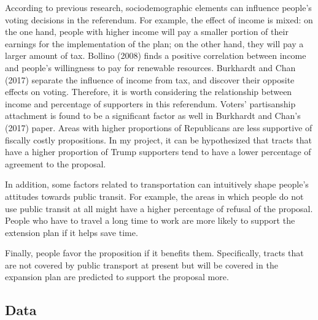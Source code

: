 \documentclass[
]{article}
\begin{document}
According to previous research, sociodemographic elements can influence
people's voting decisions in the referendum. For example, the effect of
income is mixed: on the one hand, people with higher income will pay a
smaller portion of their earnings for the implementation of the plan; on
the other hand, they will pay a larger amount of tax. Bollino (2008)
finds a positive correlation between income and people's willingness to
pay for renewable resources. Burkhardt and Chan (2017) separate the
influence of income from tax, and discover their opposite effects on
voting. Therefore, it is worth considering the relationship between
income and percentage of supporters in this referendum. Voters'
partisanship attachment is found to be a significant factor as well in
Burkhardt and Chan's (2017) paper. Areas with higher proportions of
Republicans are less supportive of fiscally costly propositions. In my
project, it can be hypothesized that tracts that have a higher
proportion of Trump supporters tend to have a lower percentage of
agreement to the proposal.

In addition, some factors related to transportation can intuitively
shape people's attitudes towards public transit. For example, the areas
in which people do not use public transit at all might have a higher
percentage of refusal of the proposal. People who have to travel a long
time to work are more likely to support the extension plan if it helps
save time.

Finally, people favor the proposition if it benefits them. Specifically,
tracts that are not covered by public transport at present but will be
covered in the expansion plan are predicted to support the proposal
more.

\hypertarget{data}{%
\subsection{Data}\label{data}}
\end{document}
